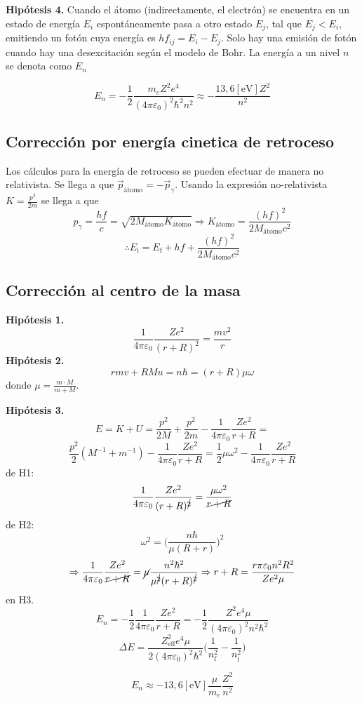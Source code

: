 \documentclass[10pt,twocolumn,titlepage]{article}
\newcommand{\inpar}[1]{\Bigg( #1 \Bigg)} %
\newcommand{\inicial}{\textrm{i}}
\newcommand{\final}{\textrm{f}}
\newcommand{\atomo}{ {\textrm{átomo}} }
\begin{document}
\textbf{Hipótesis 4.} Cuando el átomo (indirectamente, el electrón) se encuentra en un estado de energía $E_i$ espontáneamente pasa a otro estado $E_j$, tal que $E_j<E_i$, emitiendo un fotón cuya energía es $hf_{ij}=E_i-E_j$.
Solo hay una emisión de fotón cuando hay una desexcitación según el modelo de Bohr. La energía a un nivel $n$ se denota como $E_n$

$$E_n=-\frac{1}{2}\frac{m_eZ^2e^4}{(4\pi\varepsilon_0)^2\hbar^2n^2}\approx -\frac{13,6 \left[\si{\eV}\right] Z^2}{n^2} $$
\subsection{Corrección por energía cinetica de retroceso}
Los cálculos para la energía de retroceso se pueden efectuar de manera no relativista. Se llega a que $\vec{p}_{\atomo}=-\vec{p}_\gamma$. Usando la expresión no-relativista $K=\frac{p^2}{2m}$ se llega a que
$$p_\gamma=\frac{hf}{c}=\sqrt{2M_\atomo K_\atomo} \Rightarrow K_\atomo=\frac{(hf)^2}{2M_\atomo c^2}$$
$$\therefore E_\inicial=E_\final+hf + \frac{(hf)^2}{2M_\atomo c^2}$$

\subsection{Corrección al centro de la masa}
\textbf{Hipótesis 1.} 
$$ \frac{1}{4\pi \varepsilon_0}\frac{Ze^2}{(r+R)^2}=\frac{mv^2}{r} $$
\textbf{Hipótesis 2.}
$$rmv+RMu=n\hbar=(r+R)\mu \omega $$
donde $\mu = \frac{m\cdot M}{m+M}$. \par \vspace{.3cm}
\textbf{Hipótesis 3.}
$$E=K+U=\frac{p^2}{2M}+\frac{p^2}{2m}-\frac{1}{4\pi\varepsilon_0}\frac{Ze^2}{r+R}=$$ $$ \frac{p^2}{2}(M^{-1}+m^{-1})- \frac{1}{4\pi\varepsilon_0}\frac{Ze^2}{r+R}=\frac{1}{2}\mu \omega^2- \frac{1}{4\pi\varepsilon_0}\frac{Ze^2}{r+R}$$
de H1:
$$ \frac{1}{4\pi\varepsilon_0}\frac{Ze^2}{(r+R)^{\cancel{2}} }=\frac{\mu\omega^2}{\cancel{ r+R} } $$
de H2:
$$ \omega^2=\inpar{\frac{n\hbar}{\mu(R+r)}}^2 $$
$$\Rightarrow \frac{1}{4\pi\varepsilon_0} \frac{Ze^2}{ \cancel {r+R} }=\cancel{\mu} \frac{n^2\hbar^2}{\mu^{\cancel{2}} (r+R)^{\cancel{2} } }\Rightarrow r+R=\frac{r\pi\varepsilon_0 n^2R^2}{Ze^2 \mu} $$
en H3.
$$E_n= - \frac{1}{2}\frac{1}{4\pi\varepsilon_0}\frac{Ze^2}{r+R}=-\frac{1}{2}\frac{Z^2e^4 \mu}{(4\pi\varepsilon_0)^2 n^2\hbar^2} $$
 $$\Delta E =\frac{Z_{\textrm{eff}}^2e^4 \mu }{2(4\pi\varepsilon_0)^2\hbar^2} \inpar{\frac{1}{n^2_\final} - \frac{1}{n^2_\inicial}}$$

$$E_n\approx -13,6[\si{\eV}]\frac{\mu}{m_e}\frac{Z^2}{n^2} $$
\end{document}
